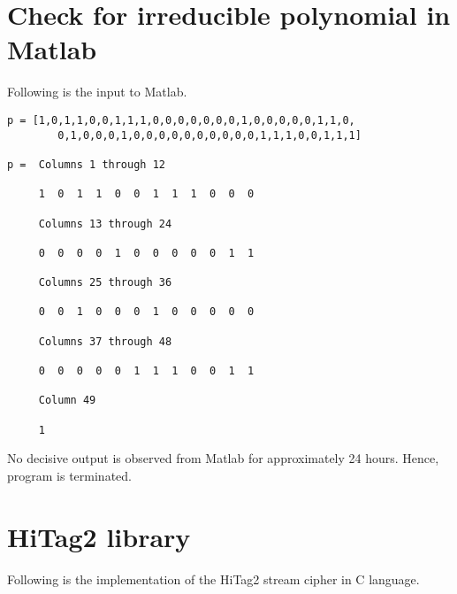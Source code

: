 \chapter{Check for irreducible polynomial in Matlab}
\label{app:irreducible-polynomial}
Following is the input to Matlab.
 
\begin{lstlisting}[frame=tb]
p = [1,0,1,1,0,0,1,1,1,0,0,0,0,0,0,0,1,0,0,0,0,0,1,1,0,
		0,1,0,0,0,1,0,0,0,0,0,0,0,0,0,0,1,1,1,0,0,1,1,1]

p =  Columns 1 through 12

     1  0  1  1  0  0  1  1  1  0  0  0

  	 Columns 13 through 24

     0  0  0  0  1  0  0  0  0  0  1  1

     Columns 25 through 36

     0  0  1  0  0  0  1  0  0  0  0  0

     Columns 37 through 48

     0  0  0  0  0  1  1  1  0  0  1  1

     Column 49

     1
\end{lstlisting}

No decisive output is observed from Matlab for approximately 24 hours. Hence, program is terminated.

\chapter{HiTag2 library}
\label{app:hitag2-lib}
Following is the implementation of the HiTag2 stream cipher in C language.
 
